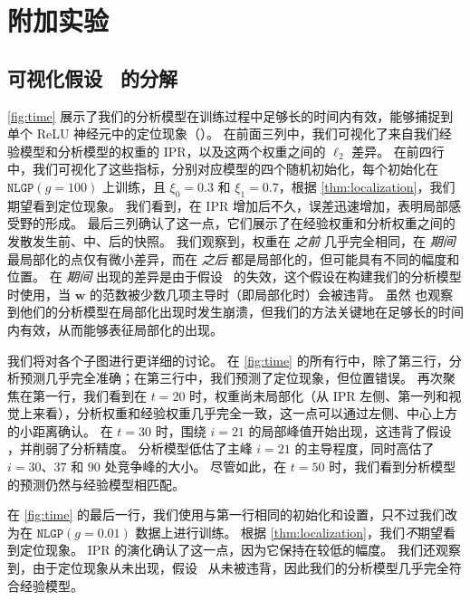 \section{附加实验}

\subsection{可视化假设~ 的分解}

\cref{fig:time} 展示了我们的分析模型在训练过程中足够长的时间内有效，能够捕捉到单个 ReLU 神经元中的定位现象（）。
在前面三列中，我们可视化了来自我们经验模型和分析模型的权重的 IPR，以及这两个权重之间的 $\ell_2$ 差异。
在前四行中，我们可视化了这些指标，分别对应模型的四个随机初始化，每个初始化在 $\texttt{NLGP}(g=100)$ 上训练，且 $\xi_0 = 0.3$ 和 $\xi_1 = 0.7$，根据 \cref{thm:localization}，我们期望看到定位现象。
我们看到，在 IPR 增加后不久，误差迅速增加，表明局部感受野的形成。
最后三列确认了这一点，它们展示了在经验权重和分析权重之间的发散发生前、中、后的快照。
我们观察到，权重在 \emph{之前} 几乎完全相同，在 \emph{期间} 最局部化的点仅有微小差异，而在 \emph{之后} 都是局部化的，但可能具有不同的幅度和位置。
在 \emph{期间} 出现的差异是由于假设~ 的失效，这个假设在构建我们的分析模型时使用，当 $\mathbf{w}$ 的范数被少数几项主导时（即局部化时）会被违背。
虽然 \cite{ingrosso2022data} 也观察到他们的分析模型在局部化出现时发生崩溃，但我们的方法关键地在足够长的时间内有效，从而能够表征局部化的出现。

我们将对各个子图进行更详细的讨论。
在 \cref{fig:time} 的所有行中，除了第三行，分析预测几乎完全准确；在第三行中，我们预测了定位现象，但位置错误。
再次聚焦在第一行，我们看到在 $t=20$ 时，权重尚未局部化（从 IPR 左侧、第一列和视觉上来看），分析权重和经验权重几乎完全一致，这一点可以通过左侧、中心上方的小距离确认。
在 $t=30$ 时，围绕 $i=21$ 的局部峰值开始出现，这违背了假设 ，并削弱了分析精度。
分析模型低估了主峰 $i=21$ 的主导程度，同时高估了 $i=30$、$37$ 和 $90$ 处竞争峰的大小。
尽管如此，在 $t=50$ 时，我们看到分析模型的预测仍然与经验模型相匹配。

在 \cref{fig:time} 的最后一行，我们使用与第一行相同的初始化和设置，只不过我们改为在 $\texttt{NLGP}(g=0.01)$ 数据上进行训练。
根据 \cref{thm:localization}，我们\emph{不}期望看到定位现象。
IPR 的演化确认了这一点，因为它保持在较低的幅度。
我们还观察到，由于定位现象从未出现，假设~ 从未被违背，因此我们的分析模型几乎完全符合经验模型。


